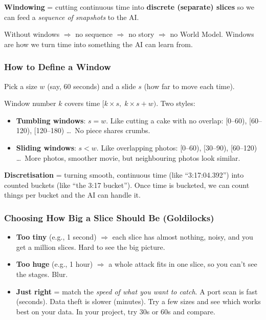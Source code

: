 \documentclass[11pt,a4paper]{article}
\begin{document}
\begin{keybox}
\textbf{Windowing} = cutting continuous time into \textbf{discrete (separate)
slices} so we can feed a \emph{sequence of snapshots} to the AI.

Without windows $\Rightarrow$ no sequence $\Rightarrow$ no story $\Rightarrow$
no World Model. Windows are how we turn time into something the AI can learn
from.
\end{keybox}

\subsubsection{How to Define a Window}

Pick a size $w$ (say, 60 seconds) and a slide $s$ (how far to move each time).

Window number $k$ covers time $[k \times s,\; k \times s + w)$. Two styles:

\begin{itemize}[leftmargin=1.6em,itemsep=2pt]
  \item \textbf{Tumbling windows}: $s = w$. Like cutting a cake with no overlap:
        [0--60), [60--120), [120--180) \dots\ No piece shares crumbs.
  \item \textbf{Sliding windows}: $s < w$. Like overlapping photos:
        [0--60), [30--90), [60--120) \dots\ More photos, smoother movie, but
        neighbouring photos look similar.
\end{itemize}

\begin{jargonbox}
\textbf{Discretisation} = turning smooth, continuous time (like ``3:17:04.392'')
into counted buckets (like ``the 3:17 bucket''). Once time is bucketed, we can
count things per bucket and the AI can handle it.
\end{jargonbox}

\subsubsection{Choosing How Big a Slice Should Be (Goldilocks)}

\begin{itemize}[leftmargin=1.6em,itemsep=2pt]
  \item \textbf{Too tiny} (e.g., 1 second) $\Rightarrow$ each slice has almost
        nothing, noisy, and you get a million slices. Hard to see the big
        picture.
  \item \textbf{Too huge} (e.g., 1 hour) $\Rightarrow$ a whole attack fits in
        one slice, so you can't see the stages. Blur.
  \item \textbf{Just right} = match the \emph{speed of what you want to catch}.
        A port scan is fast (seconds). Data theft is slower (minutes). Try a few
        sizes and see which works best on your data. In your project, try 30s or
        60s and compare.
\end{itemize}
\end{document}

